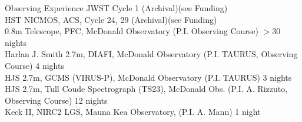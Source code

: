 \documentclass{resume} %
\begin{document}

\begin{rSection}{Observing Experience} \itemsep -5pt
    JWST Cycle 1 (Archival)\hfill (see Funding)\\
    HST NICMOS, ACS, Cycle 24, 29 (Archival)\hfill (see Funding)\\
    0.8m Telescope, PFC, McDonald Observatory (P.I. Observing Course) \hfill{$>$30 nights}\\
    Harlan J. Smith 2.7m, DIAFI, McDonald Observatory (P.I. TAURUS, Observing Course) \hfill{4 nights}\\
    HJS 2.7m, GCMS (VIRUS-P), McDonald Observatory (P.I. TAURUS) \hfill{3 nights}\\
    HJS 2.7m, Tull Coude Spectrograph (TS23), McDonald Obs. (P.I. A. Rizzuto, Observing Course) \hfill{12 nights}\\
    Keck II, NIRC2 LGS, Mauna Kea Observatory, (P.I. A. Mann) \hfill{1 night}

\vspace{-5pt}
\end{rSection}


\end{document}
